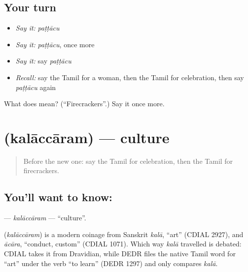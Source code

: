 \subsection*{Your turn}
\begin{itemize}
\raggedright
  \item \emph{Say it:} \emph{paṭṭācu}
  \item \emph{Say it:} \emph{paṭṭācu}, once more
  \item \emph{Say it:} say \emph{paṭṭācu}
  \item \emph{Recall:} say the Tamil for a woman, then the Tamil for celebration, then say \emph{paṭṭācu} again
\end{itemize}

\begin{tcolorbox}[breakable,colback=teal!4,colframe=teal!35!black,title={Before you move on}]
What does  mean? (\textquotedblleft{}Firecrackers\textquotedblright{}.) Say it once more.
\end{tcolorbox}
\section[\texorpdfstring{\ta{கலாச்சாரம்} (kalāccāram)}{கலாச்சாரம் (kalāccāram)}]{ (kalāccāram) — culture}

\label{lesson:TA-C246-kalaccaram}



\begin{quote}
Before the new one: say the Tamil for celebration, then the Tamil for firecrackers.
\end{quote}

\subsection*{You'll want to know: }
\textbf{} — \emph{kalāccāram} — \textquotedblleft{}culture\textquotedblright{}.

\begin{cousinweb}
\textbf{} (\emph{kalāccāram}) is a modern coinage from Sanskrit \emph{kalā}, \textquotedblleft{}art\textquotedblright{} (CDIAL 2927), and \emph{ācāra}, \textquotedblleft{}conduct, custom\textquotedblright{} (CDIAL 1071). Which way \emph{kalā} travelled is debated: CDIAL takes it from Dravidian, while DEDR files the native Tamil word for \textquotedblleft{}art\textquotedblright{} under the verb \textquotedblleft{}to learn\textquotedblright{} (DEDR 1297) and only compares \emph{kalā}.
\end{cousinweb}


